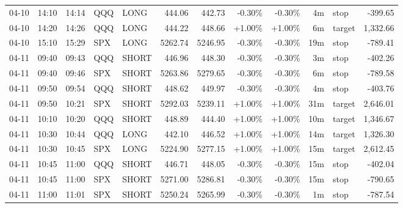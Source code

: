 \documentclass[11pt,a4paper]{article}
\begin{document}
\begin{center}
\begin{longtable}{>{\color{txtmain}}l l l l l r r r r r >{\color{txtmain}}l r}
04-10 & 14:10 & 14:14 & QQQ & LONG & 444.06 & 442.73 & \textcolor{lossred}{-0.30\%} & \textcolor{lossred}{-0.30\%} & 4m & stop & \textcolor{lossred}{-399.65} \\
04-10 & 14:20 & 14:26 & QQQ & LONG & 444.22 & 448.66 & \textcolor{wingreen}{+1.00\%} & \textcolor{wingreen}{+1.00\%} & 6m & target & \textcolor{wingreen}{1,332.66} \\
04-10 & 15:10 & 15:29 & SPX & LONG & 5262.74 & 5246.95 & \textcolor{lossred}{-0.30\%} & \textcolor{lossred}{-0.30\%} & 19m & stop & \textcolor{lossred}{-789.41} \\
04-11 & 09:40 & 09:43 & QQQ & SHORT & 446.96 & 448.30 & \textcolor{lossred}{-0.30\%} & \textcolor{lossred}{-0.30\%} & 3m & stop & \textcolor{lossred}{-402.26} \\
04-11 & 09:40 & 09:46 & SPX & SHORT & 5263.86 & 5279.65 & \textcolor{lossred}{-0.30\%} & \textcolor{lossred}{-0.30\%} & 6m & stop & \textcolor{lossred}{-789.58} \\
04-11 & 09:50 & 09:54 & QQQ & SHORT & 448.62 & 449.97 & \textcolor{lossred}{-0.30\%} & \textcolor{lossred}{-0.30\%} & 4m & stop & \textcolor{lossred}{-403.76} \\
04-11 & 09:50 & 10:21 & SPX & SHORT & 5292.03 & 5239.11 & \textcolor{wingreen}{+1.00\%} & \textcolor{wingreen}{+1.00\%} & 31m & target & \textcolor{wingreen}{2,646.01} \\
04-11 & 10:10 & 10:20 & QQQ & SHORT & 448.89 & 444.40 & \textcolor{wingreen}{+1.00\%} & \textcolor{wingreen}{+1.00\%} & 10m & target & \textcolor{wingreen}{1,346.67} \\
04-11 & 10:30 & 10:44 & QQQ & LONG & 442.10 & 446.52 & \textcolor{wingreen}{+1.00\%} & \textcolor{wingreen}{+1.00\%} & 14m & target & \textcolor{wingreen}{1,326.30} \\
04-11 & 10:30 & 10:45 & SPX & LONG & 5224.90 & 5277.15 & \textcolor{wingreen}{+1.00\%} & \textcolor{wingreen}{+1.00\%} & 15m & target & \textcolor{wingreen}{2,612.45} \\
04-11 & 10:45 & 11:00 & QQQ & SHORT & 446.71 & 448.05 & \textcolor{lossred}{-0.30\%} & \textcolor{lossred}{-0.30\%} & 15m & stop & \textcolor{lossred}{-402.04} \\
04-11 & 10:45 & 11:00 & SPX & SHORT & 5271.00 & 5286.81 & \textcolor{lossred}{-0.30\%} & \textcolor{lossred}{-0.30\%} & 15m & stop & \textcolor{lossred}{-790.65} \\
04-11 & 11:00 & 11:01 & SPX & SHORT & 5250.24 & 5265.99 & \textcolor{lossred}{-0.30\%} & \textcolor{lossred}{-0.30\%} & 1m & stop & \textcolor{lossred}{-787.54} \\

\end{longtable}
\end{center}
\end{document}
